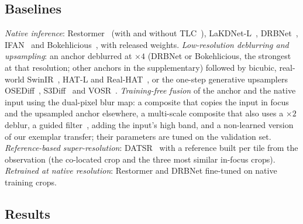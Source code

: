 \subsection{Baselines}
\label{sec:exp_baselines}
\emph{Native inference}: Restormer~\cite{zamir2022restormer} (with and without TLC~\cite{chu2022tlc}),
LaKDNet-L~\cite{ruan2023lakdnet}, DRBNet~\cite{ruan2022drbnet}, IFAN~\cite{lee2021ifan} and
Bokehlicious~\cite{seizinger2025bokehlicious}, with released weights. \emph{Low-resolution deblurring
and upsampling}: an anchor deblurred at $\times4$ (DRBNet or Bokehlicious, the strongest at that resolution;
other anchors in the supplementary) followed by bicubic, real-world SwinIR~\cite{liang2021swinir}, HAT-L and
Real-HAT~\cite{chen2023hat}, or the one-step generative upsamplers OSEDiff~\cite{wu2024osediff},
S3Diff~\cite{zhang2024s3diff} and VOSR~\cite{wu2026vosr}.
\emph{Training-free fusion} of the anchor and the native input using the dual-pixel blur map: a
composite that copies the input in focus and the upsampled anchor elsewhere, a multi-scale composite
that also uses a $\times2$ deblur, a guided filter~\cite{he2013guided}, adding the input's high band,
and a non-learned version of our exemplar transfer; their parameters are tuned on the validation set.
\emph{Reference-based super-resolution}: DATSR~\cite{cao2022datsr} with a reference built per tile from the
observation (the co-located crop and the three most similar in-focus crops). \emph{Retrained at native
resolution}: Restormer and DRBNet fine-tuned on native training crops. 

\subsection{Results}
\label{sec:exp_results}

